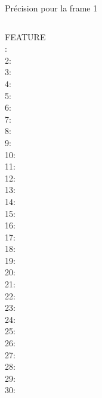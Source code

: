 \documentclass{bredelebeamer}
\begin{document}
\begin{frame}{Précision pour la frame 1}

\begin{columns}

\begin{column}{0.2\textwidth}
\begin{tcolorbox}[tabgris,tabularx={|Y|}, boxrule=0.5pt, fontupper=\tiny, fontlower=\tiny, title=FRAME 1]
FEATURE\\\hline{}:\\
2:\\
3:\\
4:\\
5:\\
6:\\
7:\\
8:\\
9:\\
10:\\
11:\\
12:\\
13:\\
14:\\
15:\\
16:\\
17:\\
18:\\
19:\\
20:\\
21:\\
22:\\
23:\\
24:\\
25:\\
26:\\
27:\\
28:\\
29:\\
30:\\
\end{tcolorbox}
\end{column}


\end{columns}
\end{frame}
\end{document}
